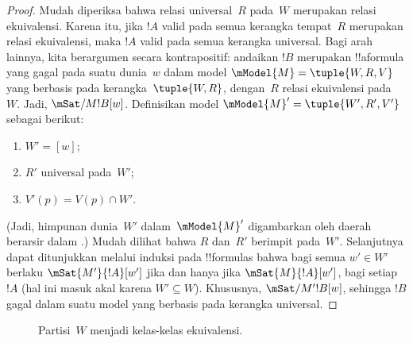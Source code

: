 \documentclass[../../../include/open-logic-section]{subfiles}
\begin{document}
\begin{proof}
  Mudah diperiksa bahwa relasi universal~$R$ pada~$W$ merupakan relasi
  ekuivalensi. Karena itu, jika $!A$ valid pada semua kerangka tempat~$R$
  merupakan relasi ekuivalensi, maka $!A$ valid pada semua kerangka universal.
  Bagi arah lainnya, kita berargumen secara kontrapositif: andaikan $!B$
  merupakan !!a{formula} yang gagal pada suatu dunia~$w$ dalam model
  $\mModel{M}=\tuple{W,R,V}$ yang berbasis pada kerangka~$\tuple{W,R}$,
  dengan~$R$ relasi ekuivalensi pada~$W$. Jadi,
  $\mSat/{M}{!B}[w]$. Definisikan model
  $\mModel{M}'=\tuple{W',R',V'}$ sebagai berikut:
  \begin{enumerate}
  \item $W'=[w]$;
  \item $R'$ universal pada~$W'$;
  \item $V'(p)=V(p)\cap W'$.
  \end{enumerate}
  (Jadi, himpunan dunia~$W'$ dalam~$\mModel{M}'$ digambarkan oleh daerah
  berarsir dalam .) Mudah dilihat bahwa $R$ dan~$R'$
  berimpit pada~$W'$. Selanjutnya dapat ditunjukkan melalui induksi pada
  !!{formula}s bahwa bagi semua $w'\in W'$ berlaku
  $\mSat{M'}{!A}[w']$ jika dan hanya jika $\mSat{M}{!A}[w']$, bagi setiap
  $!A$ (hal ini masuk akal karena $W'\subseteq W$). Khususnya,
  $\mSat/{M'}{!B}[w]$, sehingga $!B$ gagal dalam suatu model yang berbasis
  pada kerangka universal.
\end{proof}

\begin{figure}[t]
  \centering
  \caption{Partisi~$W$ menjadi kelas-kelas ekuivalensi.}
\end{figure}
\end{document}
